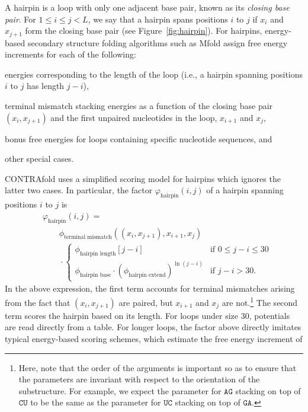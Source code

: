 \documentclass{article}
\newcommand{\A}{\texttt{A}}
\newcommand{\U}{\texttt{U}}
\newcommand{\G}{\texttt{G}}
\newcommand{\C}{\texttt{C}}
\newcommand{\vhairpin}{\varphi_\text{hairpin}}
\newcommand{\hairpinlength}{\phi_\text{hairpin length}}
\newcommand{\hairpinbase}{\phi_\text{hairpin base}}
\newcommand{\hairpinextend}{\phi_\text{hairpin extend}}
\newcommand{\mismatch}{\phi_\text{terminal mismatch}}
\begin{document}
  A hairpin is a loop with only one adjacent base pair, known as
  its \emph{closing base pair}.  For $1 \le i \le j < L$, we say that a
  hairpin spans positions $i$ to $j$ if
  $x_i$ and $x_{j+1}$ form the closing base pair (see Figure~\ref{fig:hairpin}).
  For hairpins, energy-based secondary structure folding algorithms such as
  Mfold assign free energy increments for each of the following:
  \begin{itemize-compact}
  \item energies corresponding to the length of the loop (i.e., a hairpin 
    spanning positions $i$ to $j$ has length $j-i$),
  \item terminal mismatch stacking energies as a function of the closing base
    pair $(x_i,x_{j+1})$ and the first unpaired nucleotides in the loop,
    $x_{i+1}$ and $x_j$,
  \item bonus free energies for loops containing specific nucleotide sequences, and
  \item other special cases.
  \end{itemize-compact}
  CONTRAfold uses a simplified scoring model for hairpins which ignores
  the latter two cases.  In particular, the factor $\vhairpin(i,j)$ of a hairpin 
  spanning positions $i$ to $j$ is
  \begin{align}
    &\vhairpin(i,j) = {} \nonumber \\
    &\qquad\mismatch((x_i,x_{j+1}),x_{i+1},x_j) \nonumber \\
    &\qquad{}\cdot\begin{cases}
      \hairpinlength[j-i] & \text{if $0 \le j-i \le 30$} \\
      \hairpinbase \cdot \left(\hairpinextend\right)^{\ln(j-i)} & \text{if $j-i > 30$}.
    \end{cases}
  \end{align}
  In the above expression, the first term accounts for
  terminal mismatches arising from the fact that $(x_i,x_{j+1})$ are paired, but
  $x_{i+1}$ and $x_j$ are not.\footnote{
    Here, note that the order of the arguments is important so as to ensure that the
    parameters are invariant with respect to the orientation of the substructure.
    For example, we expect the parameter for $\A\G$ stacking on top of $\C\U$ to be
    the same as the parameter for $\U\C$ stacking on top of $\G\A$.
  } The second term
  scores the hairpin based on its length.
  For loops under size 30, potentials are read directly from a table.
  For longer loops, the factor above directly imitates
  typical energy-based scoring schemes, which estimate the free energy increment of 
\end{document}
